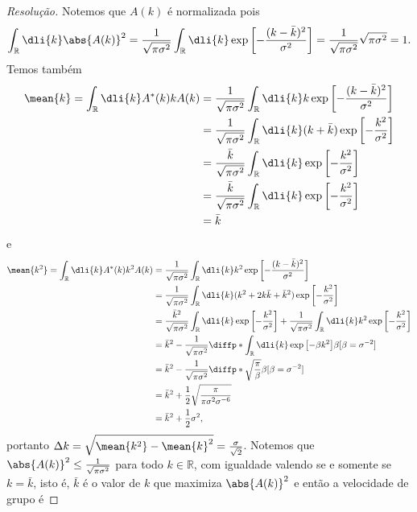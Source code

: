 \begin{proof}[Resolução]
    Notemos que \(A(k)\) é normalizada pois
    \begin{equation*}
        \int_{\mathbb{R}} \dli{k} \abs{A(k)}^2 = \frac{1}{\sqrt{\pi \sigma^2}} \int_{\mathbb{R}}\dli{k}\exp\left[-\frac{(k - \bar{k})^2}{\sigma^2}\right] = \frac{1}{\sqrt{\pi \sigma^2}} \sqrt{\pi \sigma^2} = 1.
    \end{equation*}
    Temos também
    \begin{align*}
        \mean{k} = \int_{\mathbb{R}}\dli{k} A^*(k) k A(k)
        &= \frac{1}{\sqrt{\pi \sigma^2}} \int_{\mathbb{R}} \dli{k} k \exp\left[-\frac{(k - \bar{k})^2}{\sigma^2}\right]\\
        &= \frac{1}{\sqrt{\pi \sigma^2}} \int_{\mathbb{R}} \dli{k} (k + \bar{k}) \exp\left[-\frac{k^2}{\sigma^2}\right]\\
        &= \frac{\bar{k}}{\sqrt{\pi \sigma^2}} \int_{\mathbb{R}}\dli{k} \exp\left[-\frac{k^2}{\sigma^2}\right]\\
        &= \frac{\bar{k}}{\sqrt{\pi \sigma^2}} \int_{\mathbb{R}} \dli{k} \exp\left[-\frac{k^2}{\sigma^2}\right]\\
        &= \bar{k}
    \end{align*}
    e
    \begin{align*}
        \mean{k^2} = \int_{\mathbb{R}} \dli{k} A^*(k) k^2 A(k)
        &= \frac{1}{\sqrt{\pi \sigma^2}} \int_{\mathbb{R}} \dli{k} k^2 \exp\left[-\frac{(k - \bar{k})^2}{\sigma^2}\right]\\
        &= \frac{1}{\sqrt{\pi \sigma^2}} \int_{\mathbb{R}} \dli{k} (k^2 + 2k \bar{k} + \bar{k}^2) \exp\left[-\frac{k^2}{\sigma^2}\right]\\
        &= \frac{\bar{k}^2}{\sqrt{\pi \sigma^2}} \int_{\mathbb{R}} \dli{k} \exp\left[-\frac{k^2}{\sigma^2}\right]+ \frac{1}{\sqrt{\pi \sigma^2}}\int_{\mathbb{R}}\dli{k} k^2 \exp\left[-\frac{k^2}{\sigma^2}\right]\\
        &= \bar{k}^2 - \frac{1}{\sqrt{\pi \sigma^2}}\diffp*{\int_{\mathbb{R}}\dli{k}\exp\left[- \beta k^2\right]}{\beta}[\beta = \sigma^{-2}]\\
        &= \bar{k}^2 - \frac{1}{\sqrt{\pi \sigma^2}} \diffp*{\sqrt{\frac{\pi}{\beta}}}{\beta}[\beta = \sigma^{-2}]\\
        &= \bar{k}^2 + \frac{1}{2} \sqrt{\frac{\pi}{\pi \sigma^2 \sigma^{-6}}}\\
        &= \bar{k}^2 + \frac12 \sigma^2,
    \end{align*}
    portanto \(\Delta k = \sqrt{\mean{k^2} - \mean{k}^2} = \frac{\sigma}{\sqrt{2}}\). Notemos que \(\abs{A(k)}^2 \leq \frac{1}{\sqrt{\pi \sigma^2}}\) para todo \(k \in \mathbb{R}\), com igualdade valendo se e somente se \(k = \bar{k}\), isto é, \(\bar{k}\) é o valor de \(k\) que maximiza \(\abs{A(k)}^2\) e então a velocidade de grupo é

\end{proof}
